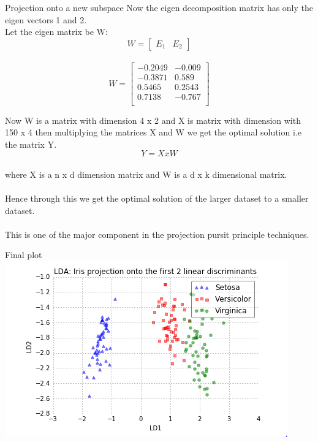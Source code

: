 \documentclass{beamer}
\begin{document}
\begin{frame}{Projection onto a new subspace}
    Now the eigen decomposition matrix has only the eigen vectors 1 and 2.
    \\
    Let the eigen matrix be W:
    \begin{equation}
        W=
        \begin{bmatrix}
        E_1 & E_2
        \end{bmatrix}
    \end{equation}
    \\
    \begin{equation}
        W=
        \begin{bmatrix}
        -0.2049 & -0.009
        \\
        -0.3871 & 0.589
        \\
        0.5465 & 0.2543
        \\
        0.7138 & -0.767
        \\
        \end{bmatrix}
    \end{equation}
\end{frame}
\begin{frame}
    Now W is a matrix with dimension 4 x 2 and X is matrix with dimension with 150 x 4 then multiplying the matrices X and W we get the optimal solution i.e the matrix Y.
    \begin{equation}
        Y=X x W
    \end{equation}
    \\ where X is a n x d dimension matrix and W is a d x k dimensional matrix.
    \\
    \\
    Hence through this we get the optimal solution of the larger dataset to a smaller dataset.
    \\
    \\
    This is one of the major component in the projection pursit principle techniques.
    \\
\end{frame}
\begin{frame}{Final plot}
\includegraphics[scale = 1]{epp_2.PNG}
    
\end{frame}
\end{document}
